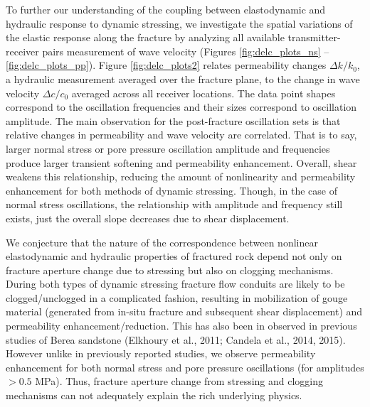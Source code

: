 \documentclass[letterpaper,10pt]{article}
\begin{document}
To further our understanding of the coupling between elastodynamic and hydraulic response to dynamic stressing, we investigate the spatial variations of the elastic response along the fracture by analyzing all available transmitter-receiver pairs measurement of wave velocity (Figures \ref{fig:delc_plots_ns} -- \ref{fig:delc_plots_pp}).
Figure \ref{fig:delc_plots2} relates permeability changes $ \Delta k/k_0 $, a hydraulic measurement averaged over the fracture plane, to the change in wave velocity $ \Delta c/c_0 $ averaged across all receiver locations. The data point shapes correspond to the oscillation frequencies and their sizes correspond to oscillation amplitude. The main observation for the post-fracture oscillation sets is that relative changes in permeability and wave velocity are correlated. That is to say, larger normal stress or pore pressure oscillation amplitude and frequencies produce larger transient softening and permeability enhancement. Overall, shear weakens this relationship, reducing the amount of nonlinearity and permeability enhancement for both methods of dynamic stressing. Though, in the case of normal stress oscillations, the relationship with amplitude and frequency still exists, just the overall slope decreases due to shear displacement.

We conjecture that the nature of the correspondence between nonlinear elastodynamic and hydraulic properties of fractured rock depend not only on fracture aperture change due to stressing but also on clogging mechanisms. During both types of dynamic stressing fracture flow conduits are likely to be clogged/unclogged in a complicated fashion, resulting in mobilization of gouge material (generated from in-situ fracture and subsequent shear displacement) and permeability enhancement/reduction. This has also been in observed in previous studies of Berea sandstone (Elkhoury et al., 2011; Candela et al., 2014, 2015). However unlike in previously reported studies, we observe permeability enhancement for both normal stress and pore pressure oscillations (for amplitudes $ > 0.5 $  MPa). Thus, fracture aperture change from stressing and clogging mechanisms can not adequately explain the rich underlying physics.

\end{document}
